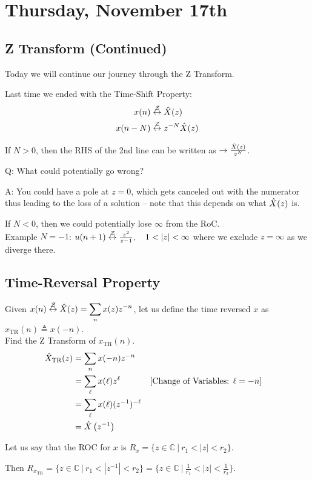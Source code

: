 \section{Thursday, November 17th}
\subsection{Z Transform (Continued)}
Today we will continue our journey through the Z Transform.

Last time we ended with the Time-Shift Property:
\begin{align*}
    x(n) &\stackrel{\mathcal{Z}}{\leftrightarrow} \hat{X}(z)
    \\
    x(n-N) &\stackrel{\mathcal{Z}}{\leftrightarrow} z^{-N}\hat{X}(z)
\end{align*}

If $N>0$, then the RHS of the 2nd line can be written as $\to\frac{\hat{X}(z)}{z^{N}}$.
\begin{important}
Q: What could potentially go wrong?
\end{important}
A: You could have a pole at $z=0$, which gets canceled out with the numerator thus leading to the loss of a solution -- note that this depends on what $\hat{X}(z)$ is.

If $N<0$, then we could potentially lose $\infty$ from the RoC.\\
Example $N=-1$: $u(n+1)\zt\frac{z^2}{z-1},\quad1<|z|<\infty$ where we exclude $z=\infty$ as we diverge there.

\hrulefill

\subsection{Time-Reversal Property}
Given $x(n)\stackrel{\mathcal{Z}}{\leftrightarrow}\hat{X}(z)=\displaystyle\sum_n x(z)z^{-n}$, let us define the time reversed $x$ as $x_{\text{TR}}(n)\triangleq x(-n)$. \\
Find the Z Transform of $x_{\text{TR}}(n)$.
\begin{align*}
    \hat{X}_{\text{TR}}(z) 
    &= \sum_n x(-n)z^{-n}
    \\
    &= \sum_\ell x(\ell)z^{\ell}
    &&\text{[Change of Variables: $\ell=-n$]}
    \\
    &= \sum_\ell x(\ell)(z^{-1})^{-\ell}
    \\
    &=\hat{X}\left(z^{-1}\right)
\end{align*}

Let us say that the ROC for $x$ is $R_x=\{z\in\mathbb C\ \Big|\ r_1<|z|<r_2\}$.

Then $R_{x_{\text{TR}}} = \{z\in\mathbb C\ \Big|\ r_1<|z^{-1}|<r_2\}
= \{z\in\mathbb C\ \Big|\ \frac1{r_1}<|z|<\frac1{r_2}\}$.

